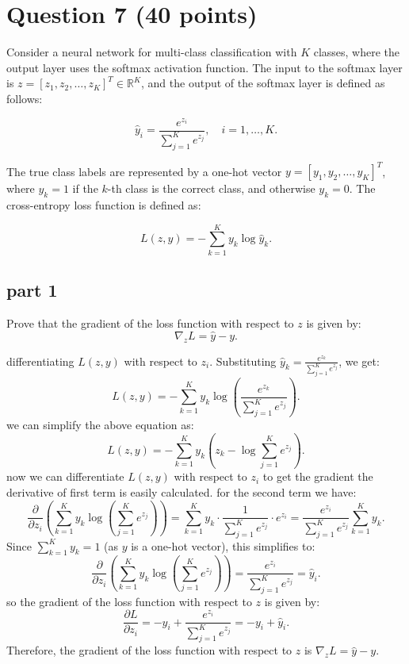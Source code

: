 \section{Question 7 (40 points)}
Consider a neural network for multi-class classification with \( K \) classes, where the output layer uses the softmax activation function. The input to the softmax layer is \( z = [z_1, z_2, \dots, z_K]^T \in \mathbb{R}^K \), and the output of the softmax layer is defined as follows:

\[
\hat{y}_i = \frac{e^{z_i}}{\sum_{j=1}^K e^{z_j}}, \quad i = 1, \dots, K.
\]

The true class labels are represented by a one-hot vector \( y = [y_1, y_2, \dots, y_K]^T \), where \( y_k = 1 \) if the \( k \)-th class is the correct class, and otherwise \( y_k = 0 \). The cross-entropy loss function is defined as:

\[
L(z, y) = -\sum_{k=1}^K y_k \log \hat{y}_k.
\]
\subsection{part 1}
Prove that the gradient of the loss function with respect to \( z \) is given by:
\[
\nabla_z L = \hat{y} - y.
\]
\begin{qsolve}
	\begin{qsolve}[]
		differentiating \( L(z, y) \) with respect to \( z_i \). Substituting \( \hat{y}_k = \frac{e^{z_k}}{\sum_{j=1}^K e^{z_j}} \), we get:
		\[
		L(z, y) = -\sum_{k=1}^K y_k \log \left( \frac{e^{z_k}}{\sum_{j=1}^K e^{z_j}} \right).
		\]		
		we can simplify the above equation as:
		\[
		L(z, y) = -\sum_{k=1}^K y_k \left( z_k - \log \sum_{j=1}^K e^{z_j} \right).
		\]
		now we can differentiate \( L(z, y) \) with respect to \( z_i \) to get the gradient the derivative of first term is easily calculated. for the second term we have:
		\[
		\frac{\partial}{\partial z_i} \left( \sum_{k=1}^K y_k \log \left( \sum_{j=1}^K e^{z_j} \right) \right) = \sum_{k=1}^K y_k \cdot \frac{1}{\sum_{j=1}^K e^{z_j}} \cdot e^{z_i} = \frac{e^{z_i}}{\sum_{j=1}^K e^{z_j}} \sum_{k=1}^K y_k.
		\]
		Since \( \sum_{k=1}^K y_k = 1 \) (as \( y \) is a one-hot vector), this simplifies to:
		\[
		\frac{\partial}{\partial z_i} \left( \sum_{k=1}^K y_k \log \left( \sum_{j=1}^K e^{z_j} \right) \right) = \frac{e^{z_i}}{\sum_{j=1}^K e^{z_j}} = \hat{y}_i.
		\]
		so the gradient of the loss function with respect to \( z \) is given by:
		\splitqsolve[\splitqsolve]
		\[
		\frac{\partial L}{\partial z_i} = -y_i + \frac{e^{z_i}}{\sum_{j=1}^K e^{z_j}} = -y_i + \hat{y}_i.
		\]
		Therefore, the gradient of the loss function with respect to \( z \) is \( \nabla_z L = \hat{y} - y \).
	\end{qsolve}
\end{qsolve}

